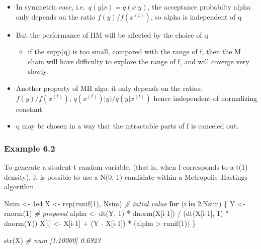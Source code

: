 \documentclass[
]{article}
\newenvironment{Shaded}{\begin{snugshade}}{\end{snugshade}}
\newcommand{\CommentTok}[1]{\textcolor[rgb]{0.56,0.35,0.01}{\textit{#1}}}
\newcommand{\ControlFlowTok}[1]{\textcolor[rgb]{0.13,0.29,0.53}{\textbf{#1}}}
\newcommand{\DecValTok}[1]{\textcolor[rgb]{0.00,0.00,0.81}{#1}}
\newcommand{\FloatTok}[1]{\textcolor[rgb]{0.00,0.00,0.81}{#1}}
\newcommand{\FunctionTok}[1]{\textcolor[rgb]{0.00,0.00,0.00}{#1}}
\newcommand{\NormalTok}[1]{#1}
\newcommand{\OtherTok}[1]{\textcolor[rgb]{0.56,0.35,0.01}{#1}}
\newcommand{\SpecialCharTok}[1]{\textcolor[rgb]{0.00,0.00,0.00}{#1}}
\providecommand{\tightlist}{%
  \setlength{\itemsep}{0pt}\setlength{\parskip}{0pt}}
\begin{document}
\begin{itemize}
\item
  In symmetric case, i.e.~\(q(y|x) = q(x|y)\), the acceptance probabilty
  alpha only depends on the ratio \(f(y)/ f(x^{(t)})\), so alpha is
  independent of q
\item
  But the performance of HM will be affected by the choice of q

  \begin{itemize}
  \tightlist
  \item
    if the supp(q) is too small, compared with the range of f, then the
    M chain will have difficulty to explore the range of f, and will
    coverge very slowly.
  \end{itemize}
\item
  Another property of MH algo: it only depends on the ratios:
  \(f(y)/ f(x^{(t)})\), \(q(x^{(t)})|y) / q(y|x^{(t)})\) hence
  independent of normalizing constant.
\item
  q may be chosen in a way that the intractable parts of f is canceled
  out.
\end{itemize}

\hypertarget{example-6.2}{%
\subsubsection{Example 6.2}\label{example-6.2}}

To generate a student-t random variable, (that is, when f corresponds to
a t(1) density), it is possible to use a N(0, 1) candidate within a
Metropolis--Hastings algorithm

\begin{Shaded}
\begin{Highlighting}[]
\NormalTok{Nsim }\OtherTok{\textless{}{-}}  \FloatTok{1e4}  
\NormalTok{X }\OtherTok{\textless{}{-}} \FunctionTok{rep}\NormalTok{(}\FunctionTok{runif}\NormalTok{(}\DecValTok{1}\NormalTok{), Nsim) }\CommentTok{\# intial value }
\ControlFlowTok{for}\NormalTok{ (i }\ControlFlowTok{in} \DecValTok{2}\SpecialCharTok{:}\NormalTok{Nsim) \{}
\NormalTok{  Y }\OtherTok{\textless{}{-}} \FunctionTok{rnorm}\NormalTok{(}\DecValTok{1}\NormalTok{)     }\CommentTok{\# proposal}
\NormalTok{  alpha }\OtherTok{\textless{}{-}} \FunctionTok{dt}\NormalTok{(Y, }\DecValTok{1}\NormalTok{) }\SpecialCharTok{*} \FunctionTok{dnorm}\NormalTok{(X[i}\DecValTok{{-}1}\NormalTok{]) }\SpecialCharTok{/}\NormalTok{ (}\FunctionTok{dt}\NormalTok{(X[i}\DecValTok{{-}1}\NormalTok{], }\DecValTok{1}\NormalTok{) }\SpecialCharTok{*} \FunctionTok{dnorm}\NormalTok{(Y))}
\NormalTok{  X[i] }\OtherTok{\textless{}{-}}\NormalTok{ X[i}\DecValTok{{-}1}\NormalTok{] }\SpecialCharTok{+}\NormalTok{ (Y }\SpecialCharTok{{-}}\NormalTok{ X[i}\DecValTok{{-}1}\NormalTok{]) }\SpecialCharTok{*}\NormalTok{ (alpha }\SpecialCharTok{\textgreater{}} \FunctionTok{runif}\NormalTok{(}\DecValTok{1}\NormalTok{))}
\NormalTok{\}}

\FunctionTok{str}\NormalTok{(X)   }\CommentTok{\# num [1:10000] 0.6923}
\end{Highlighting}
\end{Shaded}
\end{document}
